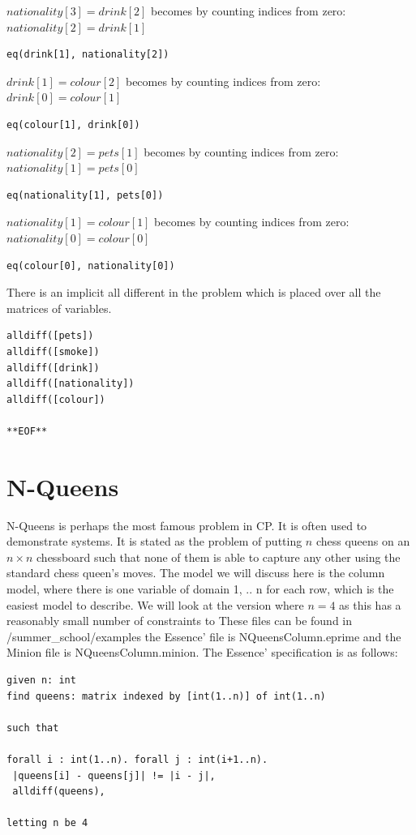 \documentclass[oneside]{book}
\begin{document}
$nationality[3] = drink[2]$ becomes by counting indices from zero: $nationality[2] = drink[1]$
\begin{verbatim}
eq(drink[1], nationality[2])
\end{verbatim}

$drink[1] = colour[2]$ becomes by counting indices from zero: $drink[0] = colour[1]$
\begin{verbatim}
eq(colour[1], drink[0])
\end{verbatim}

$nationality[2] = pets[1]$ becomes by counting indices from zero: $nationality[1] = pets[0]$
\begin{verbatim}
eq(nationality[1], pets[0])
\end{verbatim}

$nationality[1] = colour[1]$ becomes by counting indices from zero: $nationality[0] = colour[0]$
\begin{verbatim}
eq(colour[0], nationality[0])
\end{verbatim}

There is an implicit all different in the problem which is placed over all the matrices of variables.
\begin{verbatim}
alldiff([pets])
alldiff([smoke])
alldiff([drink])
alldiff([nationality])
alldiff([colour])

**EOF**
\end{verbatim}


\section{N-Queens}
N-Queens is perhaps the most famous problem in CP. It is often used to demonstrate systems. It is stated as  the problem of putting $n$ chess queens on an $n \times n$ chessboard such that none of them is able to capture any other using the standard chess queen's moves. The model we will discuss here is the column model, where there is one variable of domain 1, .. n for each row,  which is the easiest model to describe. We will look at the version where $n=4$ as this has a reasonably small number of constraints to  These files can be found in /summer\_school/examples the Essence' file is NQueensColumn.eprime and the Minion file is NQueensColumn.minion. The Essence' specification is as follows:

\begin{verbatim}
given n: int
find queens: matrix indexed by [int(1..n)] of int(1..n)

such that

forall i : int(1..n). forall j : int(i+1..n).
 |queens[i] - queens[j]| != |i - j|,
 alldiff(queens),

letting n be 4
\end{verbatim}
\end{document}
